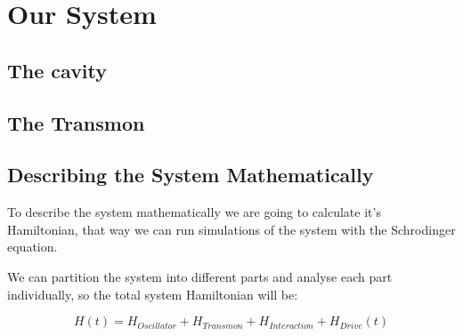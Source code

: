 \documentclass[english, a4paper, 12pt, twoside]{article}
\numberwithin{equation}{section} %
\begin{document}
\section{Our System}

\subsection{The cavity}

\subsection{The Transmon}


\subsection{Describing the System Mathematically}  %
To describe the system mathematically we are going to calculate it's Hamiltonian, that way we can run simulations of the system with the Schrodinger equation.\par
We can partition the system into different parts and analyse each part individually, so the total system Hamiltonian will be:

\begin{equation}
H(t) = H_{Oscillator} + H_{Transmon}+ H_{Interaction} + H_{Drive}(t)
\end{equation}
\end{document}
